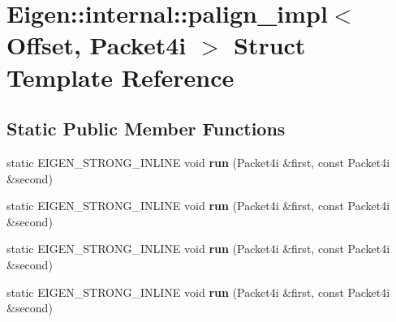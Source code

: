 \hypertarget{struct_eigen_1_1internal_1_1palign__impl_3_01_offset_00_01_packet4i_01_4}{}\section{Eigen\+:\+:internal\+:\+:palign\+\_\+impl$<$ Offset, Packet4i $>$ Struct Template Reference}
\label{struct_eigen_1_1internal_1_1palign__impl_3_01_offset_00_01_packet4i_01_4}
\subsection*{Static Public Member Functions}
\begin{DoxyCompactItemize}
\item 
\mbox{\label{struct_eigen_1_1internal_1_1palign__impl_3_01_offset_00_01_packet4i_01_4_a85d58b7eca3be350b89edc175e048335}} 
static E\+I\+G\+E\+N\+\_\+\+S\+T\+R\+O\+N\+G\+\_\+\+I\+N\+L\+I\+NE void {\bfseries run} (Packet4i \&first, const Packet4i \&second)
\item 
\mbox{\label{struct_eigen_1_1internal_1_1palign__impl_3_01_offset_00_01_packet4i_01_4_a85d58b7eca3be350b89edc175e048335}} 
static E\+I\+G\+E\+N\+\_\+\+S\+T\+R\+O\+N\+G\+\_\+\+I\+N\+L\+I\+NE void {\bfseries run} (Packet4i \&first, const Packet4i \&second)
\item 
\mbox{\label{struct_eigen_1_1internal_1_1palign__impl_3_01_offset_00_01_packet4i_01_4_a85d58b7eca3be350b89edc175e048335}} 
static E\+I\+G\+E\+N\+\_\+\+S\+T\+R\+O\+N\+G\+\_\+\+I\+N\+L\+I\+NE void {\bfseries run} (Packet4i \&first, const Packet4i \&second)
\item 
\mbox{\label{struct_eigen_1_1internal_1_1palign__impl_3_01_offset_00_01_packet4i_01_4_a85d58b7eca3be350b89edc175e048335}} 
static E\+I\+G\+E\+N\+\_\+\+S\+T\+R\+O\+N\+G\+\_\+\+I\+N\+L\+I\+NE void {\bfseries run} (Packet4i \&first, const Packet4i \&second)
\item 
\mbox{\label{struct_eigen_1_1internal_1_1palign__impl_3_01_offset_00_01_packet4i_01_4_a85d58b7eca3be350b89edc175e048335}} 

\end{DoxyCompactItemize}

